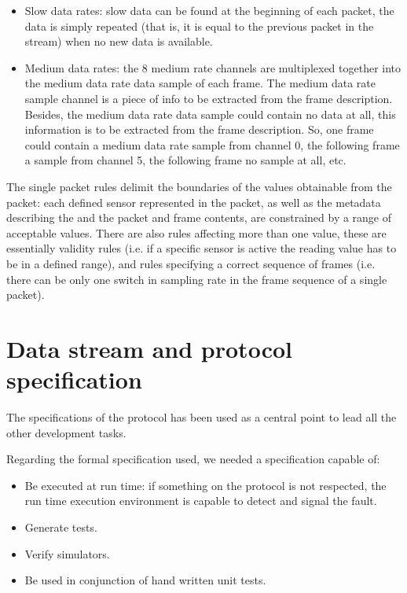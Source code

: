 \documentclass{article} \usepackage{times}
\begin{document}
\begin{itemize}
\item Slow data rates: slow data can be found at the beginning of each
  packet, the data is simply repeated (that is, it is equal to the
  previous packet in the stream) when no new data is available.
\item Medium data rates: the 8 medium rate channels are multiplexed
  together into the medium data rate data sample of each frame.  The
  medium data rate sample channel is a piece of info to be extracted
  from the frame description. Besides, the medium data rate data
  sample could contain no data at all, this information is to be
  extracted from the frame description. So, one frame could contain a
  medium data rate sample from channel 0, the following frame a sample
  from channel 5, the following frame no sample at all, etc.
\end{itemize}

The single packet rules delimit the boundaries of the values
obtainable from the packet: each defined sensor represented in the
packet, as well as the metadata describing the \STSB and the packet
and frame contents, are constrained by a range of acceptable values.
There are also rules affecting more than one value, these are
essentially validity rules (i.e. if a specific sensor is active the
reading value has to be in a defined range), and rules specifying a
correct sequence of frames (i.e. there can be only one switch in
sampling rate in the frame sequence of a single packet).



\section{Data stream and protocol specification}
\label{sec:data_stream_and_protocol_specification}

The specifications of the protocol has been used as a central point to
lead all the other development tasks.

Regarding the formal specification used, we needed a specification
capable of:

\begin{itemize}
\item Be executed at run time: if something on the protocol is not
  respected, the run time execution environment is capable to detect
  and signal the fault.
\item Generate tests.
\item Verify simulators.
\item Be used in conjunction of hand written unit tests.
\end{itemize}
\end{document}

